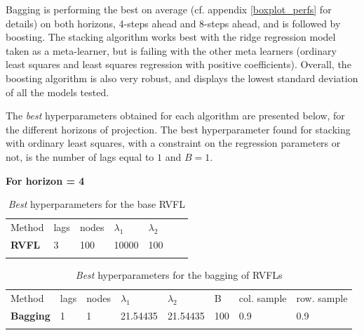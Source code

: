 Bagging is performing the best on average (cf. appendix \ref{boxplot_perfs} for details) on both horizons, 4-steps ahead and 8-steps ahead, and is followed by boosting. The stacking algorithm works best with the ridge regression model taken as a meta-learner, but is failing with the other meta learners (ordinary least squares and least squares regression with positive coefficients). Overall, the boosting algorithm is also very robust, and displays the lowest standard deviation of all the models tested. 

The \textit{best} hyperparameters obtained for each algorithm are presented below, for the different horizons of projection. The best hyperparameter found for stacking with ordinary least squares, with a constraint on the regression parameters or not, is the number of lags equal to $1$ and $B = 1$. 

\textbf{For horizon = 4}

\begin{table}[!htb]
\begin{center}
\caption{\textit{Best} hyperparameters for the base RVFL}
\label{tab:bestparamsrvfl}       %
\begin{tabular}{lllllll}
\hline\noalign{\smallskip}
Method & lags & nodes & $\lambda_1$ & $\lambda_2$ &   &   \\
\noalign{\smallskip}\hline\noalign{\smallskip}
  \textbf{RVFL} & 3 & 100 & 10000 & 100 &  &  \\
\noalign{\smallskip}\hline
\end{tabular}
\end{center}
\end{table}

\begin{table}[!htb]
\begin{center}
\caption{\textit{Best} hyperparameters for the bagging of RVFLs}
\label{tab:bestparamsbagrvfl}       %
\begin{tabular}{llllllll}
\hline\noalign{\smallskip}
Method & lags & nodes & $\lambda_1$ & $\lambda_2$ & B  &  col. sample  & row. sample\\
\noalign{\smallskip}\hline\noalign{\smallskip}
  \textbf{Bagging} & 1 & 1 & 21.54435 & 21.54435 & 100 & 0.9 & 0.9\\
\noalign{\smallskip}\hline
\end{tabular}
\end{center}
\end{table}

